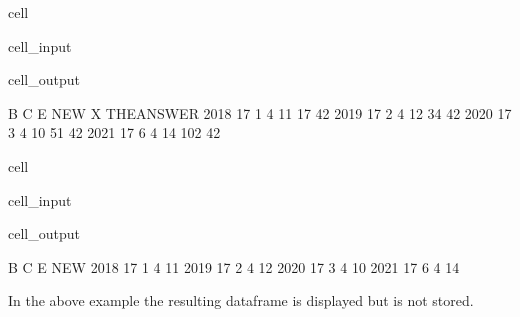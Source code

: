 \documentclass[letterpaper,10pt,english]{jupyterBook}
\begin{document}
\begin{sphinxuseclass}{cell}\begin{sphinxVerbatimInput}

\begin{sphinxuseclass}{cell_input}
\begin{sphinxVerbatim}[commandchars=\\\{\}]
\end{sphinxVerbatim}

\end{sphinxuseclass}\end{sphinxVerbatimInput}
\begin{sphinxVerbatimOutput}

\begin{sphinxuseclass}{cell_output}
\begin{sphinxVerbatim}[commandchars=\\\{\}]
       B  C  E  NEW    X  THE\PYGZus{}ANSWER
2018  17  1  4   11   17          42
2019  17  2  4   12   34          42
2020  17  3  4   10   51          42
2021  17  6  4   14  102          42
\end{sphinxVerbatim}

\end{sphinxuseclass}\end{sphinxVerbatimOutput}

\end{sphinxuseclass}
\begin{sphinxuseclass}{cell}\begin{sphinxVerbatimInput}

\begin{sphinxuseclass}{cell_input}
\begin{sphinxVerbatim}[commandchars=\\\{\}]
\end{sphinxVerbatim}

\end{sphinxuseclass}\end{sphinxVerbatimInput}
\begin{sphinxVerbatimOutput}

\begin{sphinxuseclass}{cell_output}
\begin{sphinxVerbatim}[commandchars=\\\{\}]
       B  C  E  NEW
2018  17  1  4   11
2019  17  2  4   12
2020  17  3  4   10
2021  17  6  4   14
\end{sphinxVerbatim}

\end{sphinxuseclass}\end{sphinxVerbatimOutput}

\end{sphinxuseclass}
\sphinxAtStartPar
In the above example the resulting dataframe is displayed but is not stored.
\end{document}
